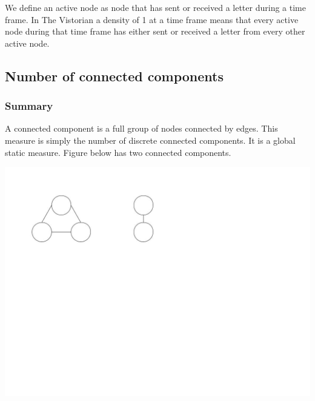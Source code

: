 We define an active node as node that has sent or received a letter during a time frame. In The Vistorian a density of 1 at a time frame means that every active node during that time frame has either sent or received a letter from every other active node.



\subsection{Number of connected components}
\subsubsection{Summary}
A connected component is a full group of nodes connected by edges. This measure is simply the number of discrete connected components. It is a global static measure.
Figure below has two connected components.

\begin{center}
\includegraphics[trim={0cm, 20cm, -10cm, 0cm}, width=180mm]{./Figures/connectedComponents1.jpg}
\end{center}

